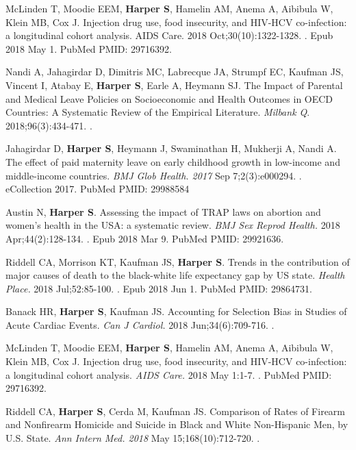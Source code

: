 \documentclass[
  letterpaper,
  DIV=11,
  numbers=noendperiod]{scrartcl}
\begin{document}
\begin{etaremune}
\item McLinden T, Moodie EEM, \textbf{Harper S}, Hamelin AM, Anema A, Aibibula W, Klein MB, Cox J. Injection drug use, food insecurity, and HIV-HCV co-infection: a longitudinal cohort analysis. AIDS Care. 2018 Oct;30(10):1322-1328. . Epub 2018 May 1. PubMed PMID: 29716392.

\item Nandi A, Jahagirdar D, Dimitris MC, Labrecque JA, Strumpf EC, Kaufman JS, Vincent I, Atabay E, \textbf{Harper S}, Earle A, Heymann SJ. The Impact of Parental and Medical Leave Policies on Socioeconomic and Health Outcomes in OECD Countries: A Systematic Review of the Empirical Literature. \emph{Milbank Q}. 2018;96(3):434-471. .

\item Jahagirdar D, \textbf{Harper S}, Heymann J, Swaminathan H, Mukherji A, Nandi A. The effect of paid maternity leave on early childhood growth in low-income and
middle-income countries. \emph{BMJ Glob Health. 2017} Sep 7;2(3):e000294. . eCollection 2017. PubMed PMID: 29988584

\item *Austin N, \textbf{Harper S}. Assessing the impact of TRAP laws on abortion and women's health in the USA: a systematic review. \emph{BMJ Sex Reprod Health.} 2018
Apr;44(2):128-134. . Epub 2018 Mar 9. PubMed PMID: 29921636.

\item *Riddell CA, Morrison KT, Kaufman JS, \textbf{Harper S}. Trends in the contribution of major causes of death to the black-white life expectancy gap by US state. \emph{Health 
Place.} 2018 Jul;52:85-100. . Epub 2018 Jun 1. PubMed PMID: 29864731.

\item Banack HR, \textbf{Harper S}, Kaufman JS. Accounting for Selection Bias in Studies of Acute Cardiac Events. \emph{Can J Cardiol.} 2018 Jun;34(6):709-716. .

\item McLinden T, Moodie EEM, \textbf{Harper S}, Hamelin AM, Anema A, Aibibula W, Klein MB, Cox J. Injection drug use, food insecurity, and HIV-HCV co-infection: a
longitudinal cohort analysis. \emph{AIDS Care.} 2018 May 1:1-7. . PubMed PMID: 29716392.

\item *Riddell CA, \textbf{Harper S}, Cerda M, Kaufman JS. Comparison of Rates of Firearm and Nonfirearm Homicide and Suicide in Black and White Non-Hispanic Men, by U.S.
State. \emph{Ann Intern Med. 2018} May 15;168(10):712-720. . 


\end{etaremune}
\end{document}
